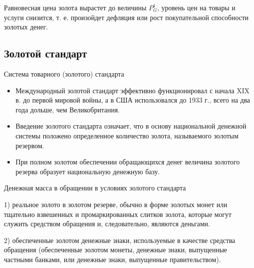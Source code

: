 \documentclass[_DKB_p1_Money.tex]{subfiles}
\begin{document}
\begin{frame}{}
\begin{figure}
	\centering
	\begin{overprint}
	\end{overprint}
	\vspace*{-2.5em}
	\caption{}
\end{figure}
\vspace*{-1.5em}
\footnotesize{
	Равновесная цена золота вырастет до величины $P_G^1$, уровень цен на товары и услуги снизится, т. е. произойдет дефляция или рост покупательной способности золотых денег.}
\end{frame}


\subsection{Золотой стандарт}
\begin{frame}{Система товарного (золотого) стандарта}
\begin{itemize}
\item
Международный золотой стандарт эффективно функционировал с начала XIX в. до первой мировой войны, а в США использовался до 1933 г., всего на два года дольше, чем Великобритания. 

\item
Введение золотого стандарта означает, что в основу национальной денежной системы положено определенное количество золота, называемого золотым резервом.

\item
При полном золотом обеспечении обращающихся денег величина золотого резерва образует национальную денежную базу.
\end{itemize}
\end{frame}

\begin{frame}{Денежная масса в обращении в условиях золотого стандарта}

1) реальное золото в золотом резерве, обычно в форме золотых монет или тщательно взвешенных и промаркированных слитков золота, которые могут служить средством обращения и, следовательно, являются деньгами. 

2) обеспеченные золотом денежные знаки, используемые в качестве средства обращения (обеспеченные золотом монеты, денежные знаки, выпущенные частными банками, или денежные знаки, выпущенные правительством). 
\end{frame}
\end{document}
